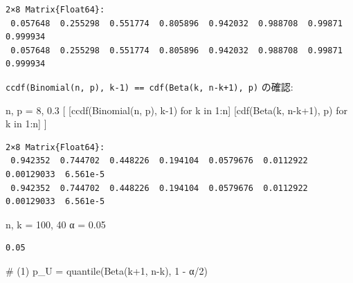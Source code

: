 \documentclass[
  letterpaper,
  DIV=11,
  numbers=noendperiod]{scrartcl}
\newenvironment{Shaded}{\begin{snugshade}}{\end{snugshade}}
\newcommand{\CharTok}[1]{\textcolor[rgb]{0.13,0.47,0.30}{#1}}
\newcommand{\CommentTok}[1]{\textcolor[rgb]{0.37,0.37,0.37}{#1}}
\newcommand{\FloatTok}[1]{\textcolor[rgb]{0.68,0.00,0.00}{#1}}
\newcommand{\FunctionTok}[1]{\textcolor[rgb]{0.28,0.35,0.67}{#1}}
\newcommand{\KeywordTok}[1]{\textcolor[rgb]{0.00,0.23,0.31}{#1}}
\newcommand{\NormalTok}[1]{\textcolor[rgb]{0.00,0.23,0.31}{#1}}
\newcommand{\OperatorTok}[1]{\textcolor[rgb]{0.37,0.37,0.37}{#1}}
\begin{document}
\begin{verbatim}
2×8 Matrix{Float64}:
 0.057648  0.255298  0.551774  0.805896  0.942032  0.988708  0.99871  0.999934
 0.057648  0.255298  0.551774  0.805896  0.942032  0.988708  0.99871  0.999934
\end{verbatim}

\texttt{ccdf(Binomial(n,\ p),\ k-1)\ ==\ cdf(Beta(k,\ n-k+1),\ p)}
の確認:

\begin{Shaded}
\begin{Highlighting}[]
\NormalTok{n, p }\OperatorTok{=} \FloatTok{8}\NormalTok{, }\FloatTok{0.3}
\NormalTok{[}
\NormalTok{    [}\FunctionTok{ccdf}\NormalTok{(}\FunctionTok{Binomial}\NormalTok{(n, p), k}\OperatorTok{{-}}\FloatTok{1}\NormalTok{) for k }\KeywordTok{in} \FloatTok{1}\OperatorTok{:}\NormalTok{n]}\CharTok{\textquotesingle{}}
\NormalTok{    [}\FunctionTok{cdf}\NormalTok{(}\FunctionTok{Beta}\NormalTok{(k, n}\OperatorTok{{-}}\NormalTok{k}\OperatorTok{+}\FloatTok{1}\NormalTok{), p) for k }\KeywordTok{in} \FloatTok{1}\OperatorTok{:}\NormalTok{n]}\CharTok{\textquotesingle{}}
\NormalTok{]}
\end{Highlighting}
\end{Shaded}

\begin{verbatim}
2×8 Matrix{Float64}:
 0.942352  0.744702  0.448226  0.194104  0.0579676  0.0112922  0.00129033  6.561e-5
 0.942352  0.744702  0.448226  0.194104  0.0579676  0.0112922  0.00129033  6.561e-5
\end{verbatim}

\begin{Shaded}
\begin{Highlighting}[]
\NormalTok{n, k }\OperatorTok{=} \FloatTok{100}\NormalTok{, }\FloatTok{40}
\NormalTok{α }\OperatorTok{=} \FloatTok{0.05}
\end{Highlighting}
\end{Shaded}

\begin{verbatim}
0.05
\end{verbatim}

\begin{Shaded}
\begin{Highlighting}[]
\CommentTok{\# (1)}
\NormalTok{p\_U }\OperatorTok{=} \FunctionTok{quantile}\NormalTok{(}\FunctionTok{Beta}\NormalTok{(k}\OperatorTok{+}\FloatTok{1}\NormalTok{, n}\OperatorTok{{-}}\NormalTok{k), }\FloatTok{1} \OperatorTok{{-}}\NormalTok{ α}\OperatorTok{/}\FloatTok{2}\NormalTok{)}
\end{Highlighting}
\end{Shaded}
\end{document}
